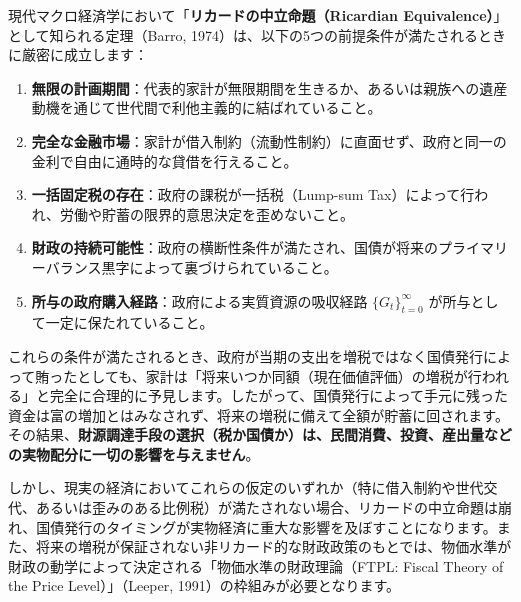 \documentclass[
  japanese,
  lualatex,
  ja=standard,
  12pt,
  a4paper]{ltjsarticle}
\providecommand{\tightlist}{%
  \setlength{\itemsep}{0pt}\setlength{\parskip}{0pt}}
\begin{document}
\begin{tcolorbox}[enhanced jigsaw, arc=.35mm, bottomrule=.15mm, bottomtitle=1mm, breakable, colback=white, colbacktitle=quarto-callout-note-color!10!white, colframe=quarto-callout-note-color-frame, coltitle=black, left=2mm, leftrule=.75mm, opacityback=0, opacitybacktitle=0.6, rightrule=.15mm, title=\textcolor{quarto-callout-note-color}{\faInfo}\hspace{0.5em}{バロー・リカードの中立命題を支える5つの前提条件}, titlerule=0mm, toprule=.15mm, toptitle=1mm]

現代マクロ経済学において「\textbf{リカードの中立命題（Ricardian
Equivalence）}」として知られる定理（Barro,
1974）は、以下の5つの前提条件が満たされるときに厳密に成立します：

\begin{enumerate}
\def\labelenumi{\arabic{enumi}.}
\tightlist
\item
  \textbf{無限の計画期間}：代表的家計が無限期間を生きるか、あるいは親族への遺産動機を通じて世代間で利他主義的に結ばれていること。
\item
  \textbf{完全な金融市場}：家計が借入制約（流動性制約）に直面せず、政府と同一の金利で自由に通時的な貸借を行えること。
\item
  \textbf{一括固定税の存在}：政府の課税が一括税（Lump-sum
  Tax）によって行われ、労働や貯蓄の限界的意思決定を歪めないこと。
\item
  \textbf{財政の持続可能性}：政府の横断性条件が満たされ、国債が将来のプライマリーバランス黒字によって裏づけられていること。
\item
  \textbf{所与の政府購入経路}：政府による実質資源の吸収経路
  \(\{G_t\}_{t=0}^\infty\) が所与として一定に保たれていること。
\end{enumerate}

これらの条件が満たされるとき、政府が当期の支出を増税ではなく国債発行によって賄ったとしても、家計は「将来いつか同額（現在価値評価）の増税が行われる」と完全に合理的に予見します。したがって、国債発行によって手元に残った資金は富の増加とはみなされず、将来の増税に備えて全額が貯蓄に回されます。その結果、\textbf{財源調達手段の選択（税か国債か）は、民間消費、投資、産出量などの実物配分に一切の影響を与えません}。

しかし、現実の経済においてこれらの仮定のいずれか（特に借入制約や世代交代、あるいは歪みのある比例税）が満たされない場合、リカードの中立命題は崩れ、国債発行のタイミングが実物経済に重大な影響を及ぼすことになります。また、将来の増税が保証されない非リカード的な財政政策のもとでは、物価水準が財政の動学によって決定される「物価水準の財政理論（FTPL:
Fiscal Theory of the Price Level）」（Leeper,
1991）の枠組みが必要となります。

\end{tcolorbox}
\end{document}
